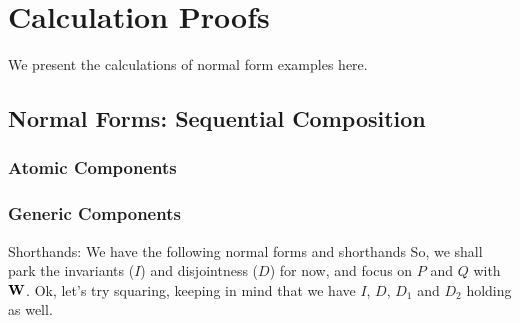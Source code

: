 \section{Calculation Proofs}\label{sec:calc-proofs}

We present the calculations of normal form examples here.

\subsection{Normal Forms: Sequential Composition}

\subsubsection{Atomic Components}

\subsubsection{Generic Components}

Shorthands:
We have the following normal forms and shorthands
So, we shall park the invariants ($I$) and disjointness ($D$) for now,
and focus on $P$ and $Q$ with $\mathbf{W}$.
Ok, let's try squaring, keeping in mind that we have $I$, $D$, $D_1$
and $D_2$ holding as well.


